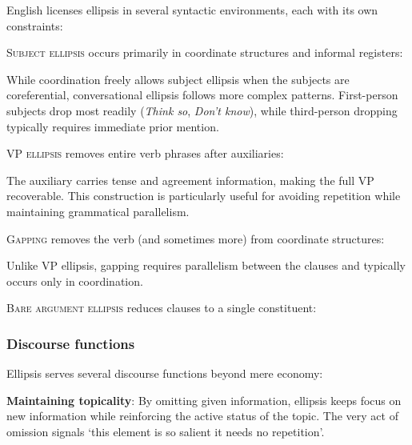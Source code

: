 English licenses ellipsis in several syntactic environments, each with its own constraints:

\textsc{Subject ellipsis} occurs primarily in coordinate structures and informal registers:

\ea
{}
\z
\z
While coordination freely allows subject ellipsis when the subjects are coreferential, conversational ellipsis follows more complex patterns. First-person subjects drop most readily (\textit{Think so}, \textit{Don't know}), while third-person dropping typically requires immediate prior mention.

\textsc{VP ellipsis} removes entire verb phrases after auxiliaries:

\ea
{}
\z
\z
The auxiliary carries tense and agreement information, making the full VP recoverable. This construction is particularly useful for avoiding repetition while maintaining grammatical parallelism.

\textsc{Gapping} removes the verb (and sometimes more) from coordinate structures:

\z

Unlike VP ellipsis, gapping requires parallelism between the clauses and typically occurs only in coordination.

\textsc{Bare argument ellipsis} reduces clauses to a single constituent:

\ea
{}
\z
\z

\subsubsection*{Discourse functions}

Ellipsis serves several discourse functions beyond mere economy:

\textbf{Maintaining topicality}: By omitting given information, ellipsis keeps focus on new information while reinforcing the active status of the topic. The very act of omission signals `this element is so salient it needs no repetition'.

